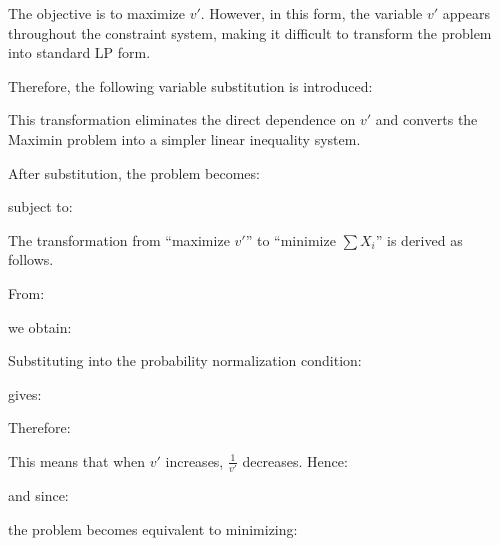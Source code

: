 \documentclass[12pt,a4paper]{article}
\begin{document}
The objective is to maximize \( v'\). However, in this form, the variable \(v'\) appears throughout the constraint system, making it difficult to transform the problem into standard LP form.

Therefore, the following variable substitution is introduced:

\noindent{}

This transformation eliminates the direct dependence on \(v'\) and converts the Maximin problem into a simpler linear inequality system. \cite{thie2008}

After substitution, the problem becomes:

\noindent{}


subject to:

\noindent{} 

\vspace{0.1cm}
The transformation from ``maximize \(v'\)'' to ``minimize \(\sum X_i\)'' is derived as follows.

From:

\noindent{}

we obtain:

\noindent{}


Substituting into the probability normalization condition:

\noindent{}

gives:

\noindent{}

Therefore:

\noindent{}

\vspace{0.1cm}
This means that when \(v'\) increases, \(\frac1{v'}\) decreases. Hence:

\noindent{}

and since:

\noindent{}

the problem becomes equivalent to minimizing:
\end{document}
